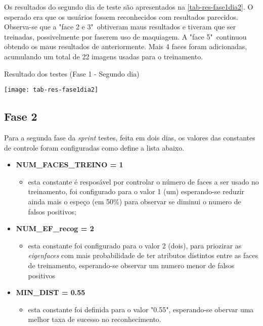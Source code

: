 Os resultados do segundo dia de teste são apresentados na \autoref{tab-res-fase1dia2}. O esperado era que os usuários fossem reconhecidos com resultados parecidos. Observa-se que a "face 2 e 3"\ obtiveram maus resultados e tiveram que ser treinadas, possivelmente por faserem uso de maquiagem. A "face 5"\ continuou obtendo os maus resultados de anteriormente. Mais 4 faces foram adicionadas, acumulando um total de 22 imagens usadas para o treinamento.

\begin{table}[h]
	\centering
	\caption{Resultado dos testes (Fase 1 - Segundo dia) }
	\texttt{[image: tab-res-fase1dia2]}
	\label{tab-res-fase1dia2}
\end{table}



\subsection{Fase 2}\label{ch:testresultfaz2}
Para a segunda fase da \textit{sprint} testes, feita em dois dias, os valores das constantes de controle foram configuradas como define a lista abaixo. 

\begin{itemize}	
	\item \textbf{NUM\_FACES\_TREINO = 1}
	\begin{itemize}	
		\item esta constante é resposável por controlar o número de faces a ser usado no treinamento, foi configurado para o valor 1 (um) esperando-se reduzir ainda mais o espeço (em 50\%) para observar se diminui o numero de falsos positivos;
	\end{itemize}
	
	\item \textbf{NUM\_EF\_recog = 2}
	\begin{itemize}	
		\item esta constante foi configurado para o valor 2 (dois), para priozirar as \textit{eigenfaces} com mais probabilidade de ter atributos distintos entre as faces de treinamento, esperando-se observar um numero menor de falsos positivos
	\end{itemize}
	
	\item \textbf{MIN\_DIST = 0.55}
	\begin{itemize}	
		\item esta constante foi definida para o valor "0.55", esperando-se obervar uma melhor taxa de sucesso no reconhecimento.
	\end{itemize}
\end{itemize}

